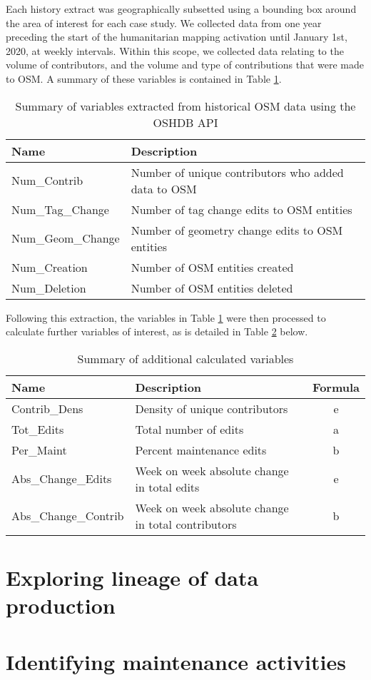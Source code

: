 Each history extract was geographically subsetted using a bounding box around the area of interest for each case study. We collected data from one year preceding the start of the humanitarian mapping activation until January 1st, 2020, at weekly intervals. Within this scope, we collected data relating to the volume of contributors, and the volume and type of contributions that were made to OSM. A summary of these variables is contained in Table \ref{tab:vars}. 

\begin{table}[ht]
\centering
\caption{Summary of variables extracted from historical OSM data using the OSHDB API}
\label{tab:vars}
\begin{tabular}[t]{ll}
\toprule
Name & Description \\
\midrule
Num\_Contrib    & Number of unique contributors who added data to OSM  \\
Num\_Tag\_Change    & Number of tag change edits to OSM entities \\
Num\_Geom\_Change    & Number of geometry change edits to OSM entities \\
Num\_Creation    & Number of OSM entities created \\
Num\_Deletion    & Number of OSM entities deleted \\
\bottomrule
\end{tabular}
\end{table}%

Following this extraction, the variables in Table \ref{tab:vars} were then processed to calculate further variables of interest, as is detailed in Table \ref{tab:varsproc} below. 

\begin{table}[ht]
\centering
\caption{Summary of additional calculated variables}
\label{tab:varsproc}
\begin{tabular}[t]{llc}
\toprule
Name & Description & Formula \\
\midrule
Contrib\_Dens    & Density of unique contributors  & e \\
Tot\_Edits    & Total number of edits &  a \\
Per\_Maint    & Percent maintenance edits & b \\
Abs\_Change\_Edits & Week on week absolute change in total edits & e \\
Abs\_Change\_Contrib & Week on week absolute change in total contributors & b \\
\bottomrule
\end{tabular}
\end{table}%

\section{Exploring lineage of data production}



\section{Identifying maintenance activities}

